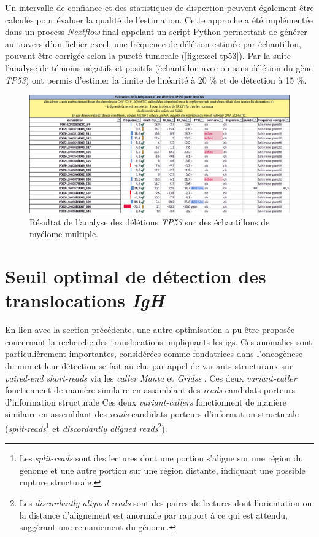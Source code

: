 Un intervalle de confiance et des statistiques de dispertion peuvent également être calculés pour évaluer la qualité de l'estimation. Cette 
approche a été implémentée dans un process \textit{Nextflow} final appelant un script Python permettant de générer au travers d'un fichier excel, 
une fréquence de délétion estimée par échantillon, pouvant être corrigée selon la pureté tumorale (\autoref{fig:excel-tp53}). 
Par la suite l'analyse de témoins négatifs et positifs (échantillon avec ou sans délétion du gène \textit{TP53}) ont permis d'estimer 
la limite de linéarité à 20 \% et de détection à 15 \%.

\begin{figure}[H]
    \centering
    \includegraphics[width=1\textwidth]{images/excel_tp53.png}
    \caption{Résultat de l'analyse des délétions \textit{TP53} sur des échantillons de myélome multiple.}
    \label{fig:excel-tp53}
\end{figure}

\section{Seuil optimal de détection des translocations \textit{IgH}}

En lien avec la section précédente, une autre optimisation a pu être proposée concernant la recherche des translocations impliquants les \glspl{ig}.
Ces anomalies sont particulièrement importantes, considérées comme fondatrices dans l'oncogènese du \gls{mm} et leur détection se fait au \gls{chu} 
par appel de variants structuraux sur \textit{paired-end short-reads} via les \textit{caller} \textit{Manta} \cite{chenMantaRapidDetection2016a} et 
\textit{Gridss} \cite{cameronGRIDSSSensitiveSpecific2017a}. Ces deux \textit{variant-caller} fonctiennent de manière similaire en assamblant des \textit{reads} 
candidats porteurs d'information structurale Ces deux \textit{variant-callers} fonctionnent de manière similaire en assemblant des \textit{reads} candidats
porteurs d'information structurale (\textit{split-reads}\footnote{Les \textit{split-reads} sont des lectures dont une portion s'aligne sur une région du génome 
et une autre portion sur une région distante, indiquant une possible rupture structurale.} et \textit{discordantly aligned reads}\footnote{Les \textit{discordantly aligned reads} 
sont des paires de lectures dont l'orientation ou la distance d'alignement est anormale par rapport à ce qui est attendu, suggérant une remaniement du génome.}).


